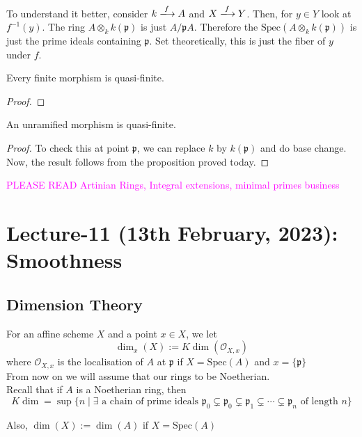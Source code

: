 \documentclass[oneside, 12pt]{scrbook}
\newcommand{\spec}{\mathrm{Spec}}
\newcommand{\pr}{\mathfrak{p}}
\theoremstyle{theorem}
\begin{document}
To understand it better, consider $k \xlongrightarrow{f} A$ and $X \xlongrightarrow{f} Y$. Then, for $y \in Y$ look at $f^{-1}(y)$. The ring $A \otimes_{k} k(\pr)$ is just $A/\pr A$. Therefore the $\spec(A \otimes_{k} k(\pr))$ is just the prime ideals containing $\pr$. Set theoretically, this is just the fiber of $y$ under $f$. 

\begin{corollary}
Every finite morphism is quasi-finite. 
\end{corollary}

\begin{proof}

\end{proof}

\begin{corollary}
An unramified morphism is quasi-finite.
\end{corollary}

\begin{proof}
To check this at point $\pr$, we can replace $k$ by $k(\pr)$ and do base change. Now, the result follows from the proposition proved today. 
\end{proof}

\textcolor{Magenta}{PLEASE READ Artinian Rings,  Integral extensions, minimal primes business}


\chapter{Lecture-11 (13th February, 2023): Smoothness}

\section{Dimension Theory}

For an affine scheme $X$ and a point $x \in X$, we let $$\dim_{x}(X) := K\dim(\mathcal{O}_{X,x})$$ where $\mathcal{O}_{X,x}$ is the localisation of $A$ at $\pr$ if $X = \spec(A)$ and $x = \{\pr \}$ \\

From now on we will assume that our rings to be Noetherian. \\

Recall that if $A$ is a Noetherian ring, then $$K\dim = \sup\{ n \mid \exists \text{ a chain of prime ideals } \pr_{0} \subsetneq \pr_{0} \subsetneq \pr_{1} \subsetneq \cdots \subsetneq \pr_{n} \text{ of length } n \}$$

Also, $\dim (X)  :=  \dim (A)$ if $X = \spec (A)$
\end{document}
